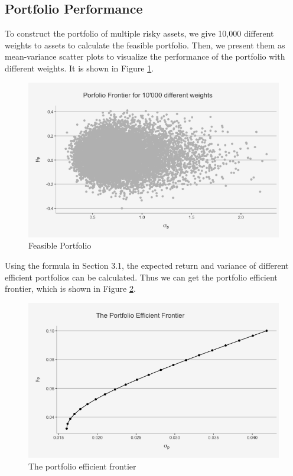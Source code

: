 \documentclass[12pt]{article}
\begin{document}
\subsection{Portfolio Performance}
To construct the portfolio of multiple risky assets, we give 10,000 different weights to assets to calculate the feasible portfolio. Then, we present them as mean-variance scatter plots to visualize the performance of the portfolio with different weights. It is shown in Figure \ref{fig1}.\\
\begin{figure}[H]
    \centering
    \includegraphics[width=0.8\linewidth]{feasible_port.png}
    \caption{Feasible Portfolio}
    \label{fig1}
\end{figure}
Using the formula in Section 3.1, the expected return and variance of different efficient portfolios can be calculated. Thus we can get the portfolio efficient frontier, which is shown in Figure \ref{fig2}.\\
\begin{figure}[H]
    \centering
    \includegraphics[width=0.8\linewidth]{EF.png}
    \caption{The portfolio efficient frontier}
    \label{fig2}
\end{figure}
\end{document}
